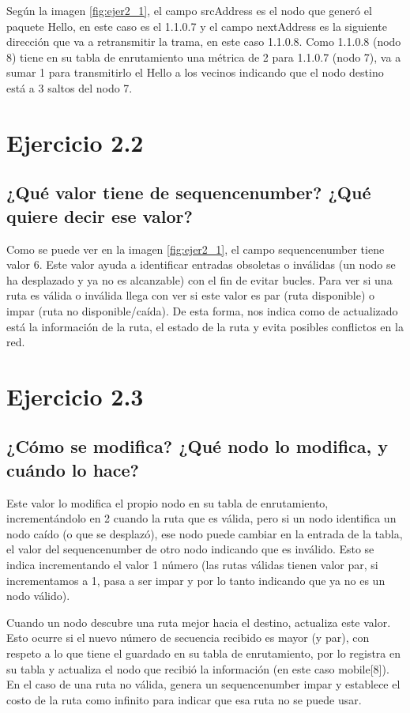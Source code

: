 Según la imagen \ref{fig:ejer2_1}, el campo srcAddress es el nodo que generó el paquete Hello, en este caso es el 1.1.0.7 y el campo nextAddress es la siguiente dirección que va a retransmitir la trama, en este caso 1.1.0.8. Como 1.1.0.8 (nodo 8) tiene en su tabla de enrutamiento una métrica de 2 para 1.1.0.7 (nodo 7), va a sumar 1 para transmitirlo el Hello a los vecinos indicando que el nodo destino está a 3 saltos del nodo 7.



\section{Ejercicio 2.2}

\subsection{¿Qué valor tiene de sequencenumber? ¿Qué quiere decir ese valor?}

Como se puede ver en la imagen \ref{fig:ejer2_1}, el campo sequencenumber tiene valor 6. Este valor ayuda a identificar entradas obsoletas o inválidas (un nodo se ha desplazado y ya no es alcanzable) con el fin de evitar bucles. Para ver si una ruta es válida o inválida llega con ver si este valor es par (ruta disponible) o impar (ruta no disponible/caída). De esta forma, nos indica como de actualizado está la información de la ruta, el estado de la ruta y evita posibles conflictos en la red.

\section{Ejercicio 2.3}

\subsection{¿Cómo se modifica? ¿Qué nodo lo modifica, y cuándo lo hace?}

Este valor lo modifica el propio nodo en su tabla de enrutamiento, incrementándolo en 2 cuando la ruta que es válida, pero si un nodo identifica un nodo caído (o que se desplazó), ese nodo puede cambiar en la entrada de la tabla, el valor del sequencenumber de otro nodo indicando que es inválido. Esto se indica incrementando el valor 1 número (las rutas válidas tienen valor par, si incrementamos a 1, pasa a ser impar y por lo tanto indicando que ya no es un nodo válido). 

Cuando un nodo descubre una ruta mejor hacia el destino, actualiza este valor. Esto ocurre si el nuevo número de secuencia recibido es mayor (y par), con respeto a lo que tiene el guardado en su tabla de enrutamiento, por lo registra en su tabla y actualiza el nodo que recibió la información (en este caso mobile[8]). En el caso de una ruta no válida, genera un sequencenumber impar y establece el costo de la ruta como infinito para indicar que esa ruta no se puede usar.

